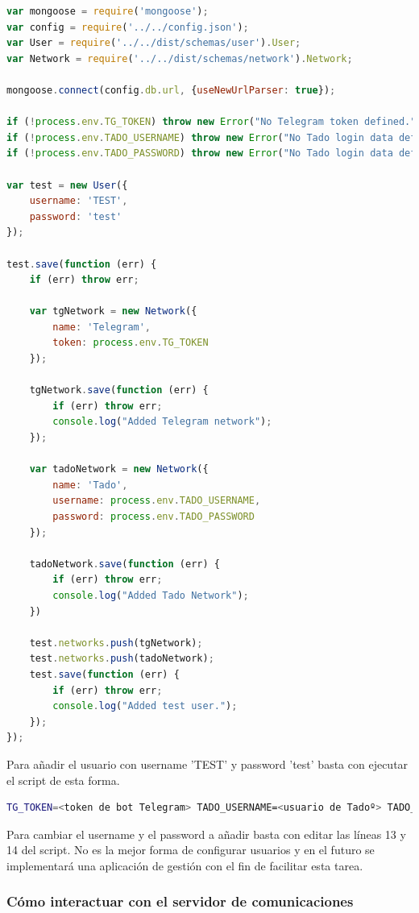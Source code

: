 \documentclass[spanish,12pt, a4paper, twoside]{paper}
\begin{document}
\begin{lstlisting}[language=JavaScript]
var mongoose = require('mongoose');
var config = require('../../config.json');
var User = require('../../dist/schemas/user').User;
var Network = require('../../dist/schemas/network').Network;

mongoose.connect(config.db.url, {useNewUrlParser: true});

if (!process.env.TG_TOKEN) throw new Error("No Telegram token defined.");
if (!process.env.TADO_USERNAME) throw new Error("No Tado login data defined.");
if (!process.env.TADO_PASSWORD) throw new Error("No Tado login data defined.");

var test = new User({
	username: 'TEST',
	password: 'test'
});

test.save(function (err) {
	if (err) throw err;

	var tgNetwork = new Network({
		name: 'Telegram',
		token: process.env.TG_TOKEN
	});

	tgNetwork.save(function (err) {
		if (err) throw err;
		console.log("Added Telegram network");
	});

	var tadoNetwork = new Network({
		name: 'Tado',
		username: process.env.TADO_USERNAME,
		password: process.env.TADO_PASSWORD
	});

	tadoNetwork.save(function (err) {
		if (err) throw err;
		console.log("Added Tado Network");
	})

	test.networks.push(tgNetwork);
	test.networks.push(tadoNetwork);
	test.save(function (err) {
		if (err) throw err;
		console.log("Added test user.");
	});
});
\end{lstlisting}

Para añadir el usuario con username 'TEST' y password 'test' basta con ejecutar el script de esta forma.

\begin{lstlisting}[language=sh]
TG_TOKEN=<token de bot Telegram> TADO_USERNAME=<usuario de Tadoº> TADO_PASSWORD=<contraseña de Tadoº> nodejs ./add-mocha-user.js
\end{lstlisting}

Para cambiar el username y el password a añadir basta con editar las líneas 13 y 14 del script. No es la mejor forma de configurar usuarios y en el futuro se implementará una aplicación de gestión con el fin de facilitar esta tarea.

\subsubsection{Cómo interactuar con el servidor de comunicaciones}
\end{document}
